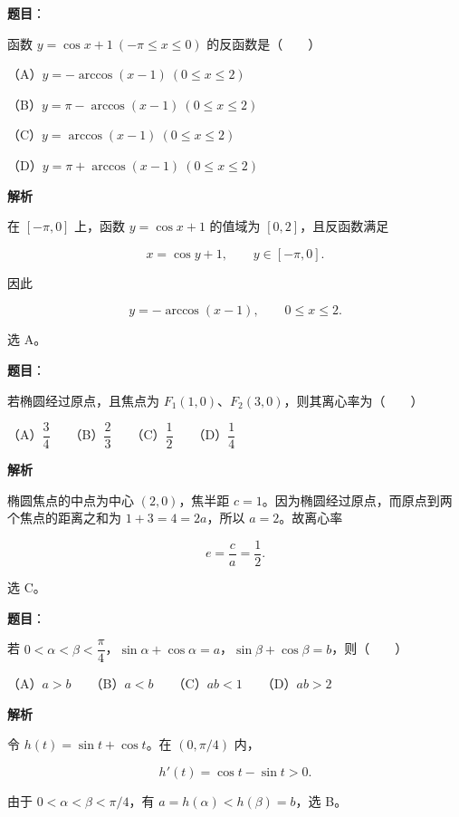 \begin{answer}

\textbf{题目}：

函数 $y=\cos x+1\ (-\pi\le x\le0)$ 的反函数是\mbox{（　　）}

（A）$y=-\arccos(x-1)\ (0\le x\le2)$

（B）$y=\pi-\arccos(x-1)\ (0\le x\le2)$

（C）$y=\arccos(x-1)\ (0\le x\le2)$

（D）$y=\pi+\arccos(x-1)\ (0\le x\le2)$

\textbf{解析}

在 $[-\pi,0]$ 上，函数 $y=\cos x+1$ 的值域为 $[0,2]$，且反函数满足

\nopagebreak[4]
\[
x=\cos y+1,\qquad y\in[-\pi,0].
\]

因此

\nopagebreak[4]
\[
y=-\arccos(x-1),\qquad 0\le x\le2.
\]

选 A。


\end{answer}
\begin{answer}

\textbf{题目}：

若椭圆经过原点，且焦点为 $F_1(1,0)$、$F_2(3,0)$，则其离心率为\mbox{（　　）}

（A）$\dfrac34$　　（B）$\dfrac23$　　（C）$\dfrac12$　　（D）$\dfrac14$

\textbf{解析}

椭圆焦点的中点为中心 $(2,0)$，焦半距 $c=1$。因为椭圆经过原点，而原点到两个焦点的距离之和为 $1+3=4=2a$，所以 $a=2$。故离心率

\nopagebreak[4]
\[
e=\frac ca=\frac12.
\]

选 C。


\end{answer}
\begin{answer}

\textbf{题目}：

若 $0<\alpha<\beta<\dfrac\pi4$，$\sin\alpha+\cos\alpha=a$，$\sin\beta+\cos\beta=b$，则\mbox{（　　）}

（A）$a>b$　　（B）$a<b$　　（C）$ab<1$　　（D）$ab>2$

\textbf{解析}

令 $h(t)=\sin t+\cos t$。在 $(0,\pi/4)$ 内，

\nopagebreak[4]
\[
h'(t)=\cos t-\sin t>0.
\]

由于 $0<\alpha<\beta<\pi/4$，有 $a=h(\alpha)<h(\beta)=b$，选 B。


\end{answer}
